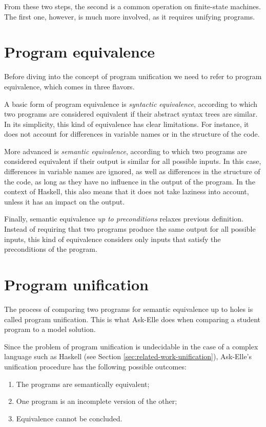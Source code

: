 From these two steps, the second is a common operation on finite-state machines. The first one, however, is much more involved, as it requires unifying programs.

\section{Program equivalence}
\label{sec:bg-program-equivalence}

Before diving into the concept of program unification we need to refer to program equivalence, which comes in three flavors.

A basic form of program equivalence is \emph{syntactic equivalence}, according to which two programs are considered equivalent if their abstract syntax trees are similar. In its simplicity, this kind of equivalence has clear limitations. For instance, it does not account for differences in variable names or in the structure of the code.

More advanced is \emph{semantic equivalence}, according to which two programs are considered equivalent if their output is similar for all possible inputs. In this case, differences in variable names are ignored, as well as differences in the structure of the code, as long as they have no influence in the output of the program. In the context of Haskell, this also means that it does not take laziness into account, unless it has an impact on the output.

Finally, semantic equivalence \emph{up to preconditions} relaxes previous definition. Instead of requiring that two programs produce the same output for all possible inputs, this kind of equivalence considers only inputs that satisfy the preconditions of the program.

\section{Program unification}
\label{sec:bg-unification}

The process of comparing two programs for semantic equivalence up to holes is called program unification. This is what Ask-Elle does when comparing a student program to a model solution.

Since the problem of program unification is undecidable in the case of a complex language such as Haskell (see Section \ref{sec:related-work-unification}), Ask-Elle's unification procedure has the following possible outcomes:

\begin{enumerate}
    \item The programs are semantically equivalent;
    \item One program is an incomplete version of the other;
    \item Equivalence cannot be concluded.
\end{enumerate}

